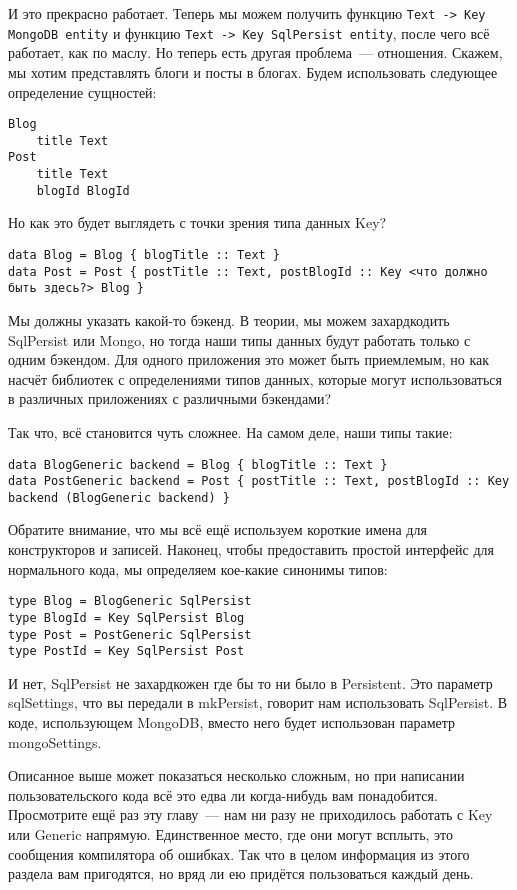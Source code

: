 И это прекрасно работает. Теперь мы можем получить функцию
\lstinline'Text -> Key MongoDB entity' и функцию
\lstinline'Text -> Key SqlPersist entity', после
чего всё работает, как по маслу. Но теперь есть другая проблема~--- отношения.
Скажем, мы хотим представлять блоги и посты в блогах. Будем использовать
следующее определение сущностей:

\begin{lstlisting}
Blog
    title Text
Post
    title Text
    blogId BlogId
\end{lstlisting}

Но как это будет выглядеть с точки зрения типа данных Key?

\begin{lstlisting}
data Blog = Blog { blogTitle :: Text }
data Post = Post { postTitle :: Text, postBlogId :: Key <что должно быть здесь?> Blog }
\end{lstlisting}

Мы должны указать какой-то бэкенд. В теории, мы можем захардкодить SqlPersist
или Mongo, но тогда наши типы данных будут работать только с одним бэкендом.
Для одного приложения это может быть приемлемым, но как насчёт библиотек с
определениями типов данных, которые могут использоваться в различных
приложениях с различными бэкендами?

Так что, всё становится чуть сложнее. На самом деле, наши типы такие:

\begin{lstlisting}
data BlogGeneric backend = Blog { blogTitle :: Text }
data PostGeneric backend = Post { postTitle :: Text, postBlogId :: Key backend (BlogGeneric backend) }
\end{lstlisting}

Обратите внимание, что мы всё ещё используем короткие имена для конструкторов и
записей. Наконец, чтобы предоставить простой интерфейс для нормального кода, мы
определяем кое-какие синонимы типов:

\begin{lstlisting}
type Blog = BlogGeneric SqlPersist
type BlogId = Key SqlPersist Blog
type Post = PostGeneric SqlPersist
type PostId = Key SqlPersist Post
\end{lstlisting}

И нет, SqlPersist не захардкожен где бы то ни было в Persistent. Это параметр
sqlSettings, что вы передали в mkPersist, говорит нам использовать SqlPersist.
В коде, использующем MongoDB, вместо него будет использован параметр
mongoSettings.

Описанное выше может показаться несколько сложным, но при написании
пользовательского кода всё это едва ли когда-нибудь вам понадобится.
Просмотрите ещё раз эту главу~--- нам ни разу не приходилось работать с Key или
Generic напрямую. Единственное место, где они могут всплыть, это сообщения
компилятора об ошибках. Так что в целом информация из этого раздела вам
пригодятся, но вряд ли ею придётся пользоваться каждый день.

